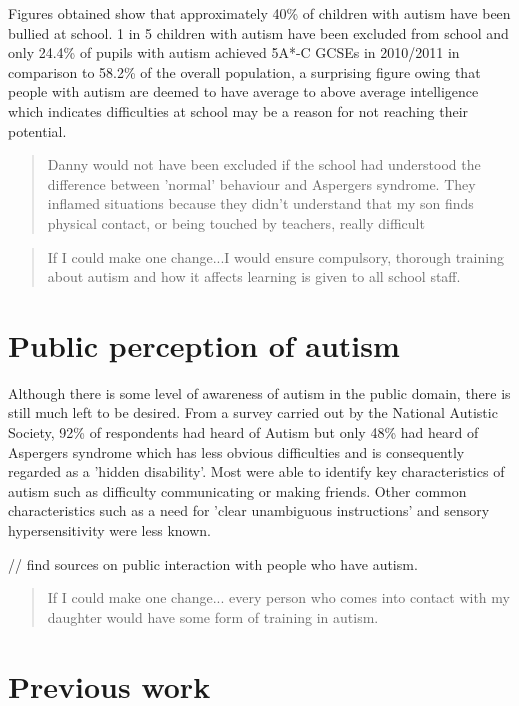 \documentclass[11pt]{report}
\begin{document}
Figures obtained show that approximately 40\% of children with autism have been bullied at school. 1 in 5 children with autism have been excluded from school \cite{nasschool} and only 24.4\% of pupils with autism achieved 5A*-C GCSEs in 2010/2011 in comparison to 58.2\% of the overall population\cite{statsandfacts}, a surprising figure owing that people with autism are deemed to have average to above average intelligence which indicates difficulties at school may be a reason for not reaching their potential.

\begin{quote}
Danny would not have been excluded if the school had understood the difference between 'normal' behaviour and Aspergers syndrome. They inflamed situations because they didn't understand that my son finds physical contact, or being touched by teachers, really difficult \cite{nasschool}
\end{quote}

\begin{quote}
If I could make one change...I would ensure compulsory, thorough training about autism and how it affects learning is given to all school staff. \cite{nasschool}
\end{quote}

\section{Public perception of autism}
Although there is some level of awareness of autism in the public domain, there is still much left to be desired.  From a survey carried out by the National Autistic Society, 92\% of respondents had heard of Autism but only 48\% had heard of Aspergers syndrome which has less obvious difficulties and is consequently regarded as a 'hidden disability'. Most were able to identify key characteristics of autism such as difficulty communicating or making friends. Other common characteristics such as a need for 'clear unambiguous instructions' and sensory hypersensitivity were less known\cite{autismmisconception}. 

// find sources on public interaction with people who have autism.

\begin{quote}
If I could make one change... every person who comes into contact with my daughter would have some form of training in autism.\cite{nasschool}
\end{quote}


\section{Previous work}
\end{document}
